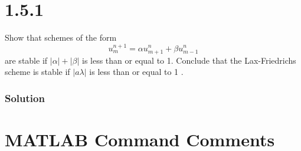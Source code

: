 \documentclass[12pt]{article}
\begin{document}
\section*{1.5.1}

Show that schemes of the form
$$
u_{m}^{n+1}=\alpha u_{m+1}^{n}+\beta u_{m-1}^{n}
$$
are stable if $|\alpha|+|\beta|$ is less than or equal to 1. Conclude that the Lax-Friedrichs scheme is stable if $|a \lambda|$ is less than or equal to 1 .


\subsubsection*{Solution}

\section*{MATLAB Command Comments}
\end{document}
